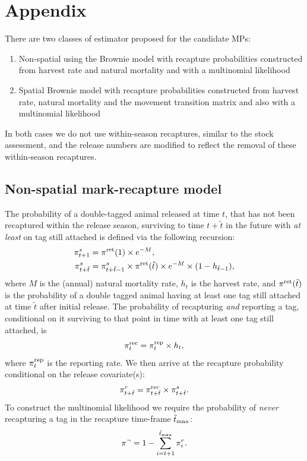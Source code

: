 \documentclass[12pt,a4paper,twoside,times,sky,standard]{csiroreport2017}
\newcommand{\ds}{\displaystyle}
\newcommand{\ttt}{\tilde{t}}
\newcommand{\ttmax}{\tilde{t}_{\rm max}}
\newcommand{\piret}{\pi^{\rm ret}}
\newcommand{\pirec}{\pi^{\rm rec}}
\newcommand{\pirep}{\pi^{\rm rep}}
\begin{document}
\clearpage

\section*{Appendix}

There are two classes of estimator proposed for the candidate MPs:

\begin{enumerate}
    \item Non-spatial using the Brownie model with recapture probabilities constructed from harvest rate and natural mortality and with a multinomial likelihood
    \item Spatial Brownie model with recapture probabilities constructed from harvest rate, natural mortality and the movement transition matrix and also with a multinomial likelihood
\end{enumerate}

In both cases we do not use within-season recaptures, similar to the stock assessment, and the release numbers are modified to reflect the removal of these within-season recaptures.

\subsection*{Non-spatial mark-recapture model}

The probability of a double-tagged animal released at time $t$, that has not been recaptured within the release season, surviving to time $t+\ttt$ in the future with \emph{at least} on tag still attached is defined via the following recursion:
\begin{align*}
    \ds \pi^s_{t+1} &= \piret(1)\times e^{-M},\\
    \ds \pi^s_{t+\ttt} &= \pi^s_{t+\ttt-1}\times\piret(\ttt)\times e^{-M}\times(1-h_{\ttt-1}),\\
\end{align*}
where $M$ is the (annual) natural mortality rate, $h_t$ is the harvest rate, and $\pi^{\rm ret}(\ttt)$ is the probability of a double tagged animal having at least one tag still attached at time $\ttt$ after initial release. The probability of recapturing \emph{and} reporting a tag, conditional on it surviving to that point in time with at least one tag still attached, is 
\begin{equation*}
    \ds \pirec_t = \pirep_t\times h_t,
\end{equation*}
where $\pirep_t$ is the reporting rate. We then arrive at the recapture probability conditional on the release covariate(s):
\begin{equation*}
    \ds \pi^r_{t+\ttt} = \pirec_{t+\ttt}\times\pi^s_{t+\ttt}.
\end{equation*}
To construct the multinomial likelihood we require the probability of \emph{never} recapturing a tag in the recapture time-frame $\ttmax$:
\begin{equation*}
    \ds \pi^{\neg}=1-\sum\limits_{i=t+1}^{\ttmax}\pi^r_{i}.
\end{equation*}
\end{document}
